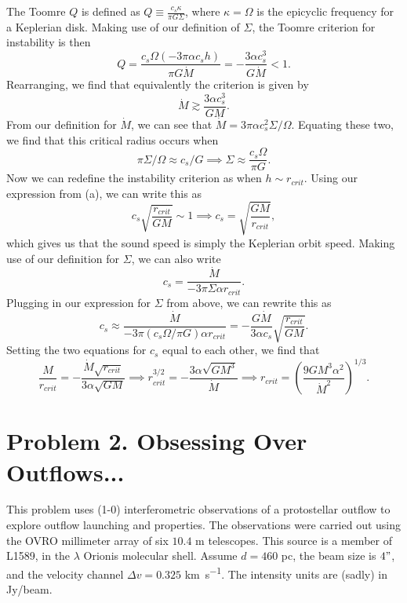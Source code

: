 \documentclass[11pt]{article}
\newenvironment{tight_enumerate}{
    \begin{enumerate}[label=(\alph*)]
    \setlength{\itemsep}{3pt}
    \setlength{\parskip}{0pt}}
    {\end{enumerate}}
\begin{document}
\begin{tight_enumerate}
\item The Toomre $Q$ is defined as $Q \equiv \frac{{c_s}\kappa}{{\pi}G\Sigma}$, where $\kappa = \Omega$ is the epicyclic frequency for a Keplerian disk. Making use of our definition of $\Sigma$, the Toomre criterion for instability is then 
\[Q = \frac{c_s\Omega(-3\pi\alpha{c_s}h)}{\pi{G}\dot{M}} = -\frac{3\alpha{c_s^3}}{G\dot{M}} < 1.\]
Rearranging, we find that equivalently the criterion is given by 
\[\dot{M} \gtrsim \frac{3\alpha{c_s^3}}{GM}.\]
From our definition for $\dot{M}$, we can see that $\dot{M} = 3\pi\alpha{c_s^2}\Sigma/\Omega$. Equating these two, we find that this critical radius occurs when 
\[\pi\Sigma/\Omega \approx c_s/G \implies \Sigma \approx \frac{c_s\Omega}{\pi{G}}.\]
Now we can redefine the instability criterion as when $h \sim r_{crit}$. Using our expression from (a), we can write this as 
\[c_s\sqrt{\frac{r_{crit}}{GM}} \sim 1 \implies c_s = \sqrt{\frac{GM}{r_{crit}}},\]
which gives us that the sound speed is simply the Keplerian orbit speed. Making use of our definition for $\Sigma$, we can also write
\[c_s = \frac{\dot{M}}{-3\pi\Sigma\alpha{r_{crit}}}.\]
Plugging in our expression for $\Sigma$ from above, we can rewrite this as 
\[c_s \approx \frac{\dot{M}}{-3\pi(c_s\Omega/\pi{G})\alpha{r_{crit}}} = -\frac{G\dot{M}}{3{\alpha}c_s}\sqrt{\frac{r_{crit}}{GM}}.\]
Setting the two equations for $c_s$ equal to each other, we find that 
\[\frac{M}{r_{crit}} = -\frac{\dot{M}\sqrt{r_{crit}}}{3\alpha\sqrt{GM}} \implies r_{crit}^{3/2} = -\frac{3\alpha\sqrt{GM^3}}{\dot{M}} \implies r_{crit} = \left(\frac{9GM^3\alpha^2}{\dot{M}^2}\right)^{1/3}.\]
\end{tight_enumerate}



\newpage
\section*{Problem 2. Obsessing Over Outflows...}
This problem uses (1-0) interferometric observations of a protostellar outflow to explore outflow launching and properties. The observations were carried out using the OVRO millimeter array of six $10.4$ \si{\meter} telescopes. This source is a member of L1589, in the $\lambda$ Orionis molecular shell. Assume $d = 460$ \si{pc}, the beam size is $4"$, and the velocity channel $\Delta{v} = 0.325$ \si{\kilo\meter\per\second}. The intensity units are (sadly) in \si{Jy/beam}.
\end{document}
